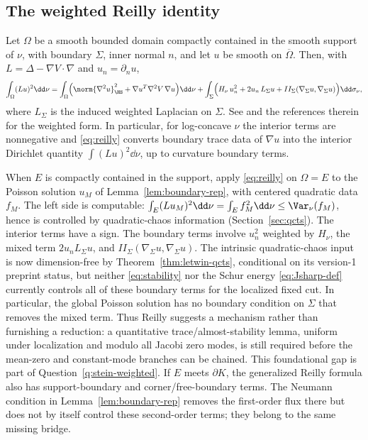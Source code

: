 \documentclass[../../main.tex]{subfiles}
\begin{document}
\subsection{The weighted Reilly identity}

\begin{proposition}
\label{prop:reilly}
Let $\Omega$ be a smooth bounded domain compactly contained in the smooth support of $\nu$, with boundary $\Sigma$, inner normal $n$,
and let $u$ be smooth on $\overline\Omega$. Then, with $L=\Delta-\nabla V\cdot\nabla$ and
$u_n=\partial_nu$,
\begin{equation}\label{eq:reilly}
  \int_\Omega(Lu)^2\dd\nu
  =\int_\Omega\Bigl(\norm{\nabla^2u}_\HS^2+\nabla u^T\nabla^2V\,\nabla u\Bigr)\dd\nu
  +\int_\Sigma\Bigl(H_\nu\,u_n^2+2u_n\,L_\Sigma u
  +II_\Sigma(\nabla_\Sigma u,\nabla_\Sigma u)\Bigr)\dd\sigma_\nu ,
\end{equation}
where $L_\Sigma$ is the induced weighted Laplacian on $\Sigma$. See
\cite{Milman2009Isoperimetric,Rosales2014} and the references therein for the weighted form.
In particular, for log-concave $\nu$ the interior terms are nonnegative and
\eqref{eq:reilly} converts boundary trace data of $\nabla u$ into the interior Dirichlet
quantity $\int(Lu)^2\dd\nu$, up to curvature boundary terms.
\end{proposition}

\begin{remark}
\label{rem:dirichlet-trace}
When $E$ is compactly contained in the support, apply \eqref{eq:reilly} on $\Omega=E$ to the Poisson solution $u_M$ of
Lemma~\ref{lem:boundary-rep}, with centered quadratic data $f_M$. The left side is computable:
$\int_E(Lu_M)^2\dd\nu=\int_E f_M^2\dd\nu\le\Var_\nu(f_M)$, hence is controlled by
quadratic-chaos information (Section~\ref{sec:qcts}). The
interior terms have a sign. The boundary terms involve $u_n^2$ weighted by $H_\nu$, the mixed
term $2u_nL_\Sigma u$, and $II_\Sigma(\nabla_\Sigma u,\nabla_\Sigma u)$. The intrinsic
quadratic-chaos input is now dimension-free by Theorem~\ref{thm:letwin-qcts}, conditional on its
version-1 preprint status, but neither \eqref{eq:stability} nor the Schur energy
\eqref{eq:Jsharp-def} currently controls all of these boundary terms for the localized fixed cut.
In particular, the global Poisson solution has no boundary condition on $\Sigma$ that removes the
mixed term. Thus Reilly suggests a mechanism rather than furnishing a reduction: a quantitative
trace/almost-stability lemma, uniform under localization and modulo all Jacobi zero modes, is
still required before the mean-zero and constant-mode branches can be chained. This foundational
gap is part of Question~\ref{q:stein-weighted}. If $E$ meets $\partial K$, the generalized
Reilly formula also has support-boundary and corner/free-boundary terms. The Neumann condition in
Lemma~\ref{lem:boundary-rep} removes the first-order flux there but does not by itself control
these second-order terms; they belong to the same missing bridge.
\end{remark}
\end{document}
